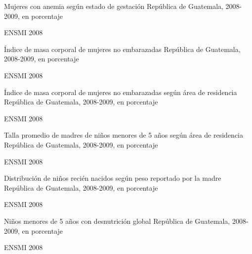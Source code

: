
{%
 }%
{%
 Mujeres con anemia según estado de gestación} %
{%
 República de Guatemala, 2008-2009, en porcentaje} %
{%
 \begin{tikzpicture}[x=1pt,y=1pt]    \end{tikzpicture}}%
{%
ENSMI 2008 } %


%
{%
}%
{%
	Índice de masa corporal de mujeres no embarazadas} %
{%
	República de Guatemala, 2008-2009, en porcentaje} %
{%
	\begin{tikzpicture}[x=1pt,y=1pt]    \end{tikzpicture}}%
{%
	ENSMI 2008} %



%
{%
}%
{%
	Índice de masa corporal de mujeres no embarazadas según área de residencia} %
{%
	República de Guatemala, 2008-2009, en porcentaje} %
{%
	\begin{tikzpicture}[x=1pt,y=1pt]    \end{tikzpicture}}%
{%
	ENSMI 2008} %



%
{%
}%
{%
	Talla promedio de madres  de niños menores de 5 años según área de residencia} %
{%
	República de Guatemala, 2008-2009, en porcentaje} %
{%
	\begin{tikzpicture}[x=1pt,y=1pt]    \end{tikzpicture}}%
{%
	ENSMI 2008} %


%
{%
}%
{%
	Distribución de niños recién nacidos según peso reportado por la madre} %
{%
	República de Guatemala, 2008-2009, en porcentaje} %
{%
	\begin{tikzpicture}[x=1pt,y=1pt]    \end{tikzpicture}}%
{%
	ENSMI 2008} %


%
{%
}%
{%
	Niños menores de 5 años con desnutrición global} %
{%
	República de Guatemala, 2008-2009, en porcentaje} %
{%
	\begin{tikzpicture}[x=1pt,y=1pt]    \end{tikzpicture}}%
{%
	ENSMI 2008} %

